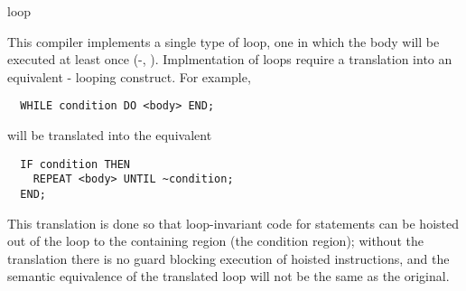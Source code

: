\begin{instruction}{loop}

  \begin{notes}
    This compiler implements a single type of loop, one in which the
    body will be executed at least once (-,
    ).  Implmentation of  loops require a
    translation into an equivalent - looping
    construct.  For example,

\begin{verbatim}
  WHILE condition DO <body> END;
\end{verbatim}

    will be translated into the equivalent

\begin{verbatim}
  IF condition THEN
    REPEAT <body> UNTIL ~condition;
  END;
\end{verbatim}

    This translation is done so that loop-invariant code for
     statements can be hoisted out of the loop to the
    containing region (the  condition region); without the
    translation there is no guard blocking execution of hoisted
    instructions, and the semantic equivalence of the translated loop
    will not be the same as the original.
  \end{notes}

  \nresults

  \begin{operands}
  \item {}
  \item {}
  \end{operands}
\end{instruction}

